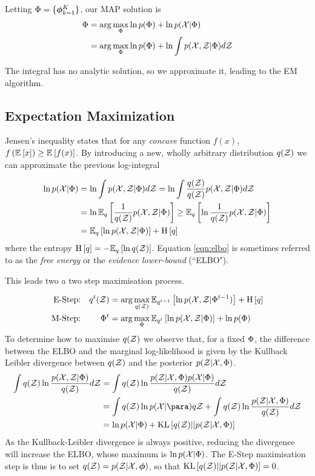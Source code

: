 Letting $\params = \{ \vv{\phi}_{k=1}^K \}$, our MAP solution is
\begin{align}
\begin{split}
\params 
    &= \arg \max_\params \ln p(\params) + \ln p(\xdat|\params) \\
    &= \arg \max_\params \ln p(\params) + \ln \int \joint d\zdat
\end{split}
\end{align}



The integral has no analytic solution, so we approximate it, leading to the EM algorithm.
\subsection{Expectation Maximization}
Jensen's inequality states that for any \emph{concave} function $f(x)$, $f\left(\ex{x}{}\right) \geq \ex{f(x)}{}$. By introducing a new, wholly arbitrary distribution $q(\zdat)$ we can approximate the previous log-integral

\begin{align}
 \ln p(\xdat|\params) & = \ln \int \joint d\zdat =  \ln \int \frac{q(\zdat)}{q(\zdat)} \joint d\zdat\\ 
     &=  \ln \ex{\oneover{q(\zdat)}\joint}{q} \geq  \ex{\ln \oneover{q(\zdat)}\joint}{q}\\
     &= \ex{\ln \joint}{q} + \ent{q} \label{eqn:elbo}
\end{align}
where the entropy $\ent{q} = -\ex{\ln q(\zdat)}{q}$. Equation \eqref{eqn:elbo} is sometimes referred to as the \emph{free energy} or the \emph{evidence lower-bound} (``ELBO").

This leads two a two step maximisation process.

\begin{align}
\text{E-Step:} & & q^t(\zdat) & = \arg \max_{q(\zdat)} \ex{\ln p(\xdat, \zdat|\params^{t-1})}{q^{t-1}} + \ent{q} \label{eqn:estep} \\
\text{M-Step:} & & \params^t & = \arg \max_{\params} \ex{\ln \joint}{q^{t}} + \ln p(\params) \label{eqn:mstep}
\end{align}
To determine how to maximise $q(\zdat)$ we observe that, for a fixed $\params$, the difference between the ELBO and the marginal log-likelihood is given by
 the Kullback Leibler divergence between $q(\zdat)$ and the posterior $p(\zdat|\xdat, \params)$.
\begin{align}
\int q(\zdat) \ln \frac{p(\xdat, \zdat|\params)}{q(\zdat)} d\zdat
& = \int q(\zdat) \ln \frac{p(\zdat|\xdat, \params)p(\xdat | \params)}{q(\zdat)} d\zdat \\
& = \int q(\zdat) \ln p(\xdat | \para) q\zdat + \int q(\zdat)\ln\frac{p(\zdat|\xdat, \params)}{q(\zdat)} d\zdat \\
& = \ln p(\xdat | \params) + \kl{q(\zdat)}{p(\zdat|\xdat, \params)}
\end{align}
As the Kullback-Leibler divergence is always positive, reducing the divergence will increase the ELBO, whose maximum is $\ln p(\xdat | \params)$. The E-Step maximisation step is thus is to set $q(\zdat) = p(\zdat | \xdat, \param)$, so that $\kl{q(\zdat)}{p(\zdat|\xdat, \params)} = 0$.

